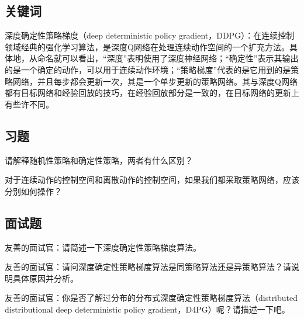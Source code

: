 \subsection{关键词}

深度确定性策略梯度（deep deterministic policy gradient，DDPG）：在连续控制领域经典的强化学习算法，是深度Q网络在处理连续动作空间的一个扩充方法。具体地，从命名就可以看出，“深度”表明使用了深度神经网络；“确定性”表示其输出的是一个确定的动作，可以用于连续动作环境；“策略梯度”代表的是它用到的是策略网络，并且每步都会更新一次，其是一个单步更新的策略网络。其与深度Q网络都有目标网络和经验回放的技巧，在经验回放部分是一致的，在目标网络的更新上有些许不同。


\subsection{习题}

 请解释随机性策略和确定性策略，两者有什么区别？

 对于连续动作的控制空间和离散动作的控制空间，如果我们都采取策略网络，应该分别如何操作？


\subsection{面试题}

 友善的面试官：请简述一下深度确定性策略梯度算法。

 友善的面试官：请问深度确定性策略梯度算法是同策略算法还是异策略算法？请说明具体原因并分析。

 友善的面试官：你是否了解过分布的分布式深度确定性策略梯度算法（distributed distributional deep deterministic policy gradient，D4PG）呢？请描述一下吧。
